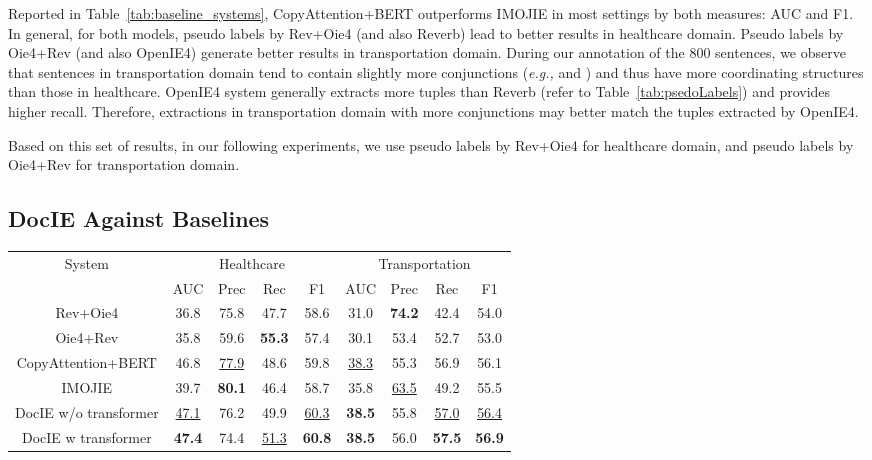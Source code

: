 \documentclass[11pt,a4paper]{article}
\newcommand{\eg}{\emph{e.g.,}\xspace}
\newcommand{\mname}{DocIE\xspace}
\begin{document}
Reported in Table~\ref{tab:baseline_systems}, CopyAttention+BERT outperforms IMOJIE in most settings by both measures: AUC and F1. In general, for both models, pseudo labels by Rev+Oie4 (and also Reverb) lead to better results in healthcare domain. Pseudo labels by Oie4+Rev (and also OpenIE4) generate better results in transportation domain.  During our annotation of the 800 sentences,  we observe that sentences in transportation domain tend to contain slightly more conjunctions (\eg {} and ) and thus have more coordinating structures than those in healthcare. OpenIE4 system generally extracts more tuples than Reverb (refer to Table~\ref{tab:psedoLabels}) and provides higher recall. Therefore, extractions in transportation domain with more conjunctions may better match the tuples extracted by OpenIE4.

Based on this set of results, in our following experiments, we use pseudo labels by Rev+Oie4 for healthcare domain, and pseudo labels by Oie4+Rev for transportation domain.





\subsection{\mname Against Baselines}\label{sec:results}


\begin{table*}
\centering
\begin{tabular}{ c|cccc|cccc}
 \toprule
 \multirow{2}{*}{System} &
  \multicolumn{4}{c|}{Healthcare} &
  \multicolumn{4}{c}{Transportation} \\
  & AUC & Prec & Rec & F1 & AUC & Prec & Rec & F1\\
 \midrule

 Rev+Oie4 & 36.8 & 75.8 &47.7 & 58.6          & 31.0 & \textbf{74.2} &42.4 & 54.0\\
 Oie4+Rev &35.8 & 59.6 & \textbf{55.3} & 57.4     &30.1 & 53.4 & 52.7 & 53.0\\
 \midrule
 CopyAttention+BERT &  46.8 & \underline{77.9} & 48.6 & 59.8           &\underline{38.3} & 55.3 & 56.9 & 56.1\\
 IMOJIE & 39.7 & \textbf{80.1} & 46.4 & 58.7           &35.8 & \underline{63.5} & 49.2 & 55.5 \\
 \midrule
 \mname w/o transformer & \underline{47.1} & 76.2 & 49.9 & \underline{60.3}           & \textbf{38.5} & 55.8 & \underline{57.0} & \underline{56.4}  \\
 \mname w transformer & \textbf{47.4} & 74.4 & \underline{51.3} & \textbf{60.8}           & \textbf{38.5} & 56.0  & \textbf{57.5} & \textbf{56.9} \\
 \bottomrule
\end{tabular}
\vspace{-0.6em}
\caption{Results of \mname and baselines. The best scores are in boldface and second best scores are underlined.}
\vspace{-0.6em}
\label{tab:final_results}
\end{table*}
\end{document}
